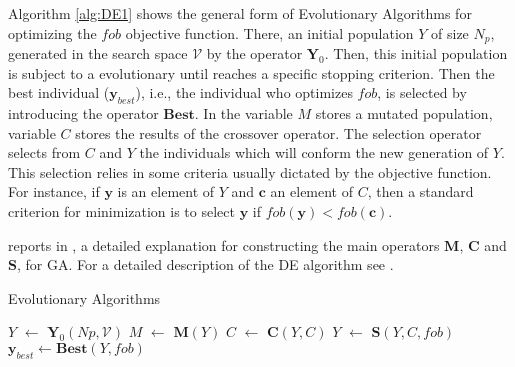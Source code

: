   Algorithm \ref{alg:DE1} shows the general form of Evolutionary Algorithms for 
optimizing the $fob$ objective function. There, an initial population $Y$ of 
size $N_p$, generated in the search space $\mathcal{V}$ by the operator 
$\mathbf{Y}_0$. Then, this initial population is subject to a evolutionary 
until reaches a specific stopping criterion. Then the best individual 
($\mathbf{y}_{best}$), i.e., the individual who optimizes $fob$, is selected by 
introducing the operator $\mathbf{Best}$. 
In  the variable $M$ stores a mutated population, 
variable $C$ stores the results of the crossover operator. The selection
operator selects from $C$ and $Y$ the individuals which will conform the new
generation of $Y$. This selection relies in some criteria 
usually dictated by the objective function. For instance, if $\mathbf{y}$ is an 
element of $Y$ and $\mathbf{c}$ an element of $C$, then a standard criterion 
for minimization is to select  $\mathbf{y}$ if 
$fob(\mathbf{y})<fob(\mathbf{c})$.

\citeauthor{Bagchi1999} reports in \cite{Bagchi1999}, a detailed explanation 
for constructing the main operators $\mathbf{M}$, $\mathbf{C}$ and 
$\mathbf{S}$, for GA. For a detailed description of the DE algorithm see 
\cite{Price_Storn2005}.
%
\begin{algorithm}[htb]
  \caption{Evolutionary Algorithms}
  \label{alg:DE1}
  \begin{algorithmic}
    \State $Y$ $\leftarrow$ $\mathbf{Y}_0(Np,\mathcal{V})$
    \State $M$ $\leftarrow$  $\mathbf{M}(Y)$
    \State $C$ $\leftarrow$  $\mathbf{C}(Y,C)$
    \State $Y$ $\leftarrow$  $\mathbf{S}(Y,C,fob)$ 
    \EndWhile
    \State $\mathbf{y}_{best} \leftarrow \mathbf{Best}(Y, fob)$
  \end{algorithmic}
\end{algorithm}%

